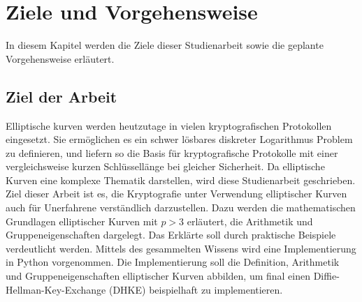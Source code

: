 \chapter{Ziele und Vorgehensweise}
In diesem Kapitel werden die Ziele dieser Studienarbeit sowie die geplante Vorgehensweise erläutert.

\section{Ziel der Arbeit}

Elliptische kurven werden heutzutage in vielen kryptografischen Protokollen eingesetzt. Sie ermöglichen es ein schwer lösbares diskreter Logarithmus Problem zu definieren, und liefern so die Basis für kryptografische Protokolle mit einer vergleichsweise kurzen Schlüssellänge bei gleicher Sicherheit. Da elliptische Kurven eine komplexe Thematik darstellen, wird diese Studienarbeit geschrieben. Ziel dieser Arbeit ist es, die Kryptografie unter Verwendung elliptischer Kurven auch für Unerfahrene verständlich darzustellen. Dazu werden die mathematischen Grundlagen elliptischer Kurven mit $p>3$ erläutert, die Arithmetik und Gruppeneigenschaften dargelegt. Das Erklärte soll durch praktische Beispiele verdeutlicht werden. Mittels des gesammelten Wissens wird eine Implementierung in Python vorgenommen. Die Implementierung soll die Definition, Arithmetik und Gruppeneigenschaften elliptischer Kurven abbilden, um final einen Diffie-Hellman-Key-Exchange (DHKE) beispielhaft zu implementieren.

